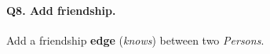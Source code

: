 \paragraph{\textbf{Q8}. Add friendship.}
Add a friendship \textbf{edge} (\emph{knows}) between two
\emph{Persons}.
